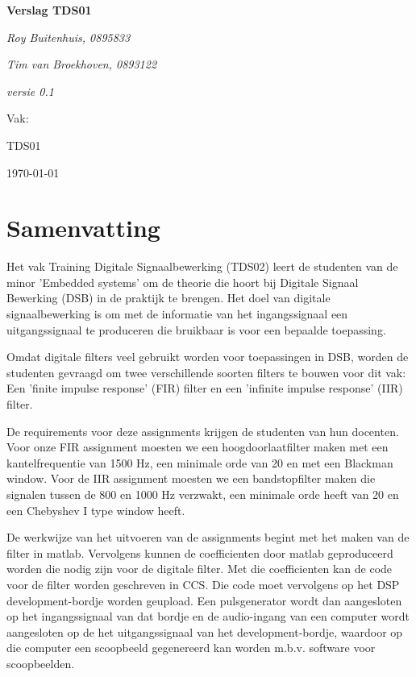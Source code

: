 \documentclass[11pt,a4paper]{article}
\def\auteureen{Roy Buitenhuis, 0895833}
\def\auteurtwee{Tim van Broekhoven, 0893122}
\def\titel{Verslag TDS01}
\def\datum{\today}
\def\versie{0.1}
\begin{document}
	
	\begin{titlepage}
		
		\centering
		{\huge\bfseries \titel \par}
		
		\vspace{1cm}
		{\Large\itshape \auteureen \par}
		{\Large\itshape \auteurtwee \par}
		\vspace{1cm}
		{\Large\itshape versie \versie\par}
				
		\vfill
		Vak:\par
		TDS01
		
		\vfill
		{\large \datum \par}
	\end{titlepage}

	\section{Samenvatting}

Het vak Training Digitale Signaalbewerking (TDS02) leert de studenten van de minor 'Embedded systems' om de theorie die hoort bij Digitale Signaal Bewerking (DSB) in de praktijk te brengen. Het doel van digitale signaalbewerking is om met de informatie van het ingangssignaal een uitgangssignaal te produceren die bruikbaar is voor een bepaalde toepassing. 

Omdat digitale filters veel gebruikt worden voor toepassingen in DSB, worden de studenten gevraagd om twee verschillende soorten filters te bouwen voor dit vak: Een 'finite impulse response' (FIR) filter en een 'infinite impulse response' (IIR) filter. 

De requirements  voor deze assignments krijgen de studenten van hun docenten. Voor onze FIR assignment moesten we een hoogdoorlaatfilter maken met een kantelfrequentie van 1500 Hz, een minimale orde van 20 en met een Blackman window. Voor de IIR assignment moesten we een bandstopfilter maken die signalen tussen de 800 en 1000 Hz verzwakt, een minimale orde heeft van 20 en een Chebyshev I type window heeft. 
	
De werkwijze van het uitvoeren van de assignments begint met het maken van de filter in matlab. Vervolgens kunnen de coefficienten door matlab geproduceerd worden die nodig zijn voor de digitale filter. Met die coefficienten kan de code voor de filter worden geschreven in CCS. Die code moet vervolgens op het DSP development-bordje worden geupload. Een pulsgenerator wordt dan aangesloten op het ingangssignaal van dat bordje en de audio-ingang van een computer wordt aangesloten op de het uitgangssignaal van het development-bordje, waardoor op die computer een scoopbeeld gegenereerd kan worden m.b.v. software voor scoopbeelden. 
\end{document}
